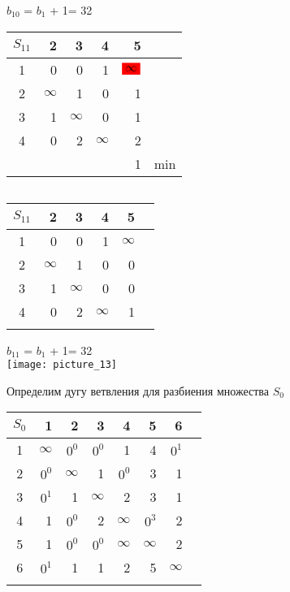 \documentclass[12pt]{article}
\begin{document}
$b_{10}$ = $b_1$ + 1= 32

\begin{flushleft}
\begin{tabular}{c||rrrr||c}
$S_{11}$ & 2 & 3 & 4 & 5 & \\
\hline
\hline
1 &  0 & 0  & 1 & $\colorbox{red}{$\infty$}$ & \\
2 &  $\infty$ & 1  & 0 & 1 & \\
3 &  1 & $\infty$  & 0 & 1 & \\
4 &  0 & 2  & $\infty$ & 2 & \\
\hline
\hline
 &  &  &  &1 & min \\
\end{tabular}
$\qquad $  
\begin{tabular}{c||rrrr||c}
$S_{11}$ & 2 & 3 & 4 & 5 & \\
\hline
\hline
1 &  0 & 0  & 1 & $\infty$ & \\
2 &  $\infty$ & 1  & 0 & 0 & \\
3 &  1 & $\infty$  & 0 & 0 & \\
4 &  0 & 2  & $\infty$ & 1 & \\
\hline
\hline
 & &  &  & & \\
\end{tabular}
\end{flushleft}

$b_{11}$ = $b_1$ + 1= 32\\


\texttt{[image: picture\_13]}

Определим дугу ветвления для разбиения множества $S_0$\\

\begin{flushleft}
\begin{tabular}{c||rrrrrr||c}
$S_0$ & 1 & 2 & 3 & 4 & 5 & 6 & \\
\hline
\hline
1 & $\infty$ & $0^0$ & $0^0$ & 1 & 4 & $0^1$ & \\
2 & $0^0$ & $\infty$ & 1 & $0^0$ & 3 & 1 & \\
3 & $0^1$ & 1 & $\infty$ & 2 & 3 & 1 & \\
4 & 1 & $0^0$ & 2 & $\infty$ & $0^3$ & 2 & \\
5 & 1 & $0^0$ & $0^0$ & $\infty$ & $\infty$ & 2 \\
6 & $0^1$ & 1 & 1 & 2 & 5 & $\infty$ & \\
\hline
\hline
 &  &  &  &  &  &  & \\
\end{tabular}
\end{flushleft}
\end{document}

